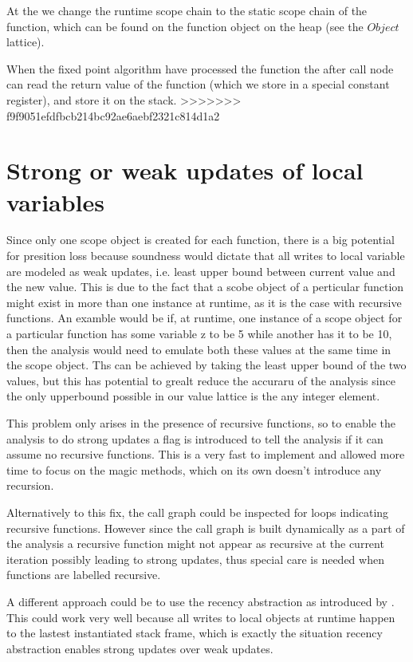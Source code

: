 At the  we change the runtime scope chain to the static scope chain of the function, which can be found on the function object on the heap (see the $Object$ lattice).

When the fixed point algorithm have processed the function the after call node can read the return value of the function (which we store in a special constant register), and store it on the stack.
>>>>>>> f9f9051efdfbcb214bc92ae6aebf2321c814d1a2

\section{Strong or weak updates of local variables}
Since only one scope object is created for each function, there is a big potential for presition loss because soundness would dictate that all writes to local variable are modeled as weak updates, i.e. least upper bound between current value and the new value. This is due to the fact that a scobe object of a perticular function might exist in more than one instance at runtime, as it is the case with recursive functions. An examble would be if, at runtime, one instance of a scope object for a particular function has some variable z to be 5 while another has it to be 10, then the analysis would need to emulate both these values at the same time in the scope object. Ths can be achieved by taking the least upper bound of the two values, but this has potential to grealt reduce the accuraru of the analysis since the only upperbound possible in our value lattice is the any integer element.

This problem only arises in the presence of recursive functions, so to enable the analysis to do strong updates a flag is introduced to tell the analysis if it can assume no recursive functions. This is a very fast to implement and allowed more time to focus on the magic methods, which on its own doesn't introduce any recursion.

Alternatively to this fix, the call graph could be inspected for loops indicating recursive functions. However since the call graph is built dynamically as a part of the analysis a recursive function might not appear as recursive at the current iteration possibly leading to strong updates, thus special care is needed when functions are labelled recursive.

A different approach could be to use the recency abstraction as introduced by \cite{recency}. This could work very well because all writes to local objects at runtime happen to the lastest instantiated stack frame, which is exactly the situation recency abstraction enables strong updates over weak updates.

